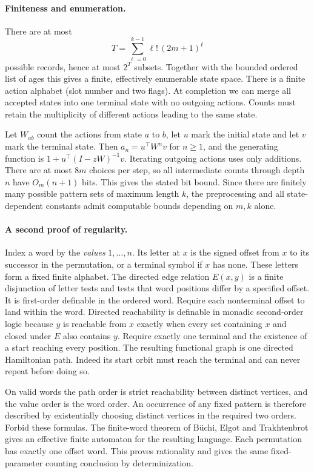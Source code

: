 \documentclass[11pt]{article}
\begin{document}
\paragraph{Finiteness and enumeration.}
There are at most
\[
 T=\sum_{\ell=0}^{k-1}\ell!\,(2m+1)^\ell
\]
possible records, hence at most $2^T$ subsets. Together with the bounded ordered list of ages this gives a finite, effectively enumerable state space. There is a finite action alphabet (slot number and two flags). At completion we can merge all accepted states into one terminal state with no outgoing actions. Counts must retain the multiplicity of different actions leading to the same state.

Let $W_{ab}$ count the actions from state $a$ to $b$, let $u$ mark the initial state and let $v$ mark the terminal state. Then $a_n=u^\top W^n v$ for $n\ge1$, and the generating function is $1+u^\top(I-zW)^{-1}v$. Iterating outgoing actions uses only additions. There are at most $8m$ choices per step, so all intermediate counts through depth $n$ have $O_m(n+1)$ bits. This gives the stated bit bound. Since there are finitely many possible pattern sets of maximum length $k$, the preprocessing and all state-dependent constants admit computable bounds depending on $m,k$ alone.

\paragraph{A second proof of regularity.}
Index a word by the \emph{values} $1,\ldots,n$. Its letter at $x$ is the signed offset from $x$ to its successor in the permutation, or a terminal symbol if $x$ has none. These letters form a fixed finite alphabet. The directed edge relation $E(x,y)$ is a finite disjunction of letter tests and tests that word positions differ by a specified offset. It is first-order definable in the ordered word. Require each nonterminal offset to land within the word. Directed reachability is definable in monadic second-order logic because $y$ is reachable from $x$ exactly when every set containing $x$ and closed under $E$ also contains $y$. Require exactly one terminal and the existence of a start reaching every position. The resulting functional graph is one directed Hamiltonian path. Indeed its start orbit must reach the terminal and can never repeat before doing so.

On valid words the path order is strict reachability between distinct vertices, and the value order is the word order. An occurrence of any fixed pattern is therefore described by existentially choosing distinct vertices in the required two orders. Forbid these formulas. The finite-word theorem of B\"uchi, Elgot and Trakhtenbrot \cite{elgot} gives an effective finite automaton for the resulting language. Each permutation has exactly one offset word. This proves rationality and gives the same fixed-parameter counting conclusion by determinization.
\end{document}
